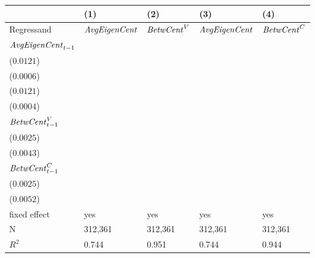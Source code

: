 \begin{tabular}{lllll}
\toprule
{} &                                      (1) &                                      (2) &                                      (3) &                                      (4) \\
\midrule
Regressand                 &                     ${\it AvgEigenCent}$ &                       ${\it BetwCent}^V$ &                     ${\it AvgEigenCent}$ &                       ${\it BetwCent}^C$ \\
${\it AvgEigenCent}_{t-1}$ &  \makecell{$0.8627^{***}$ \\ ($0.0121$)} &    \makecell{$-0.0010^{}$ \\ ($0.0006$)} &  \makecell{$0.8630^{***}$ \\ ($0.0121$)} &    \makecell{$-0.0000^{}$ \\ ($0.0004$)} \\
${\it BetwCent}^V_{t-1}$   &  \makecell{$0.0103^{***}$ \\ ($0.0025$)} &  \makecell{$0.9746^{***}$ \\ ($0.0043$)} &                              \makecell{} &                              \makecell{} \\
${\it BetwCent}^C_{t-1}$   &                              \makecell{} &                              \makecell{} &  \makecell{$0.0114^{***}$ \\ ($0.0025$)} &  \makecell{$0.9711^{***}$ \\ ($0.0052$)} \\
\midrule fixed effect      &                                      yes &                                      yes &                                      yes &                                      yes \\
N                          &                                  312,361 &                                  312,361 &                                  312,361 &                                  312,361 \\
$R^2$                      &                                    0.744 &                                    0.951 &                                    0.744 &                                    0.944 \\
\bottomrule
\end{tabular}
